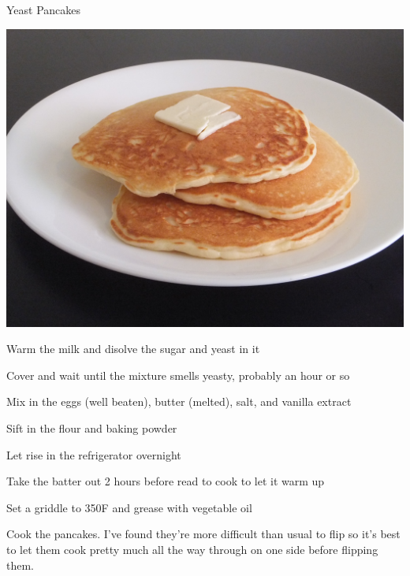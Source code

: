 \documentclass{recipe}
\begin{document}
\begin{recipe}{Yeast Pancakes}

  \begin{ingredients}
  \end{ingredients}

  \begin{images}
    \begin{image}
      \includegraphics[width=\linewidth,trim=300px 300px 200px 200px, clip=true]{yeast_pancakes-01.jpeg}
    \end{image}
  \end{images}

  \begin{steps}
  \item Warm the milk and disolve the sugar and yeast in it
  \item Cover and wait until the mixture smells yeasty, probably an
    hour or so
  \item Mix in the eggs (well beaten), butter (melted), salt, and
    vanilla extract
  \item Sift in the flour and baking powder
  \item Let rise in the refrigerator overnight
  \item Take the batter out 2 hours before read to cook to let it warm
    up
  \item Set a griddle to 350\degree F and grease with vegetable oil
  \item Cook the pancakes.  I've found they're more difficult than
    usual to flip so it's best to let them cook pretty much all the
    way through on one side before flipping them.
  \end{steps}
\end{recipe}
\end{document}
